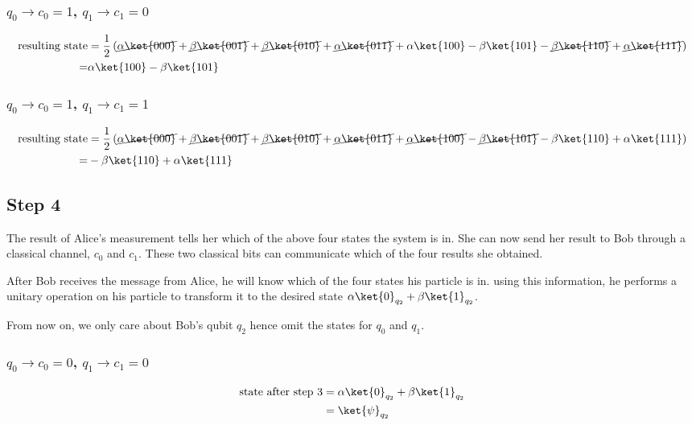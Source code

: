 \documentclass[10pt,a4paper]{article}
\newcommand{\<}{\langle}
\renewcommand{\>}{\rangle}
\newcommand{\prths}[1]{\left( #1 \right)}
\begin{document}
\subsubsection{ $q_0 \rightarrow c_0 = 1$, $q_1 \rightarrow c_1 = 0$}
\begin{align*}
\textrm{resulting state}
& =
\frac{1}{2}
\prths {
 \cancel{\alpha \ket{000}}
+\cancel{\beta  \ket{001}}
+\cancel{\beta  \ket{010}}
+\cancel{\alpha \ket{011}}
+\alpha \ket{100}
-\beta  \ket{101}
-\cancel{\beta  \ket{110}}
+\cancel{\alpha \ket{111}}
}
\\ = &
\alpha \ket{100}
-\beta  \ket{101}
\end{align*}

\subsubsection{ $q_0 \rightarrow c_0 = 1$, $q_1 \rightarrow c_1 = 1$}
\begin{align*}
\textrm{resulting state}
& =
\frac{1}{2}
\prths {
 \cancel{\alpha \ket{000}}
+\cancel{\beta  \ket{001}}
+\cancel{\beta  \ket{010}}
+\cancel{\alpha \ket{011}}
+\cancel{\alpha \ket{100}}
-\cancel{\beta  \ket{101}}
-\beta  \ket{110}
+\alpha \ket{111}
}
\\ = &
-\beta  \ket{110}
+\alpha \ket{111}
\end{align*}

\subsection{Step 4}
The result of Alice's measurement tells her which of the above four states the system is in. She can
now send her result to Bob through a classical channel, $c_0$ and $c_1$. These two classical bits
can communicate which of the four results she obtained.

After Bob receives the message from Alice, he will know which of the four states his particle is in.
using this information, he performs a unitary operation on his particle to transform it to the
desired state $\alpha \ket{0}_{q_2} + \beta \ket{1}_{q_2}$.

From now on, we only care about Bob's qubit $q_2$ hence omit the states for $q_0$ and $q_1$.

\subsubsection{ $q_0 \rightarrow c_0 = 0$, $q_1 \rightarrow c_1 = 0$}
\begin{align*}
\textrm{state after step 3}
& =
\alpha \ket{0}_{q_2}
+\beta  \ket{1}_{q_2}
\\ & = \ket{\psi}_{q_2}
\end{align*}
\end{document}
